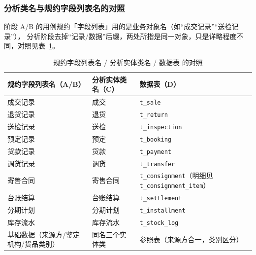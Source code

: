 \documentclass[12pt, a4paper]{ctexart}
\newcommand{\code}[1]{\texttt{\small #1}}
\begin{document}
\subsubsection{分析类名与规约字段列表名的对照}

阶段 A/B 的用例规约「字段列表」用的是业务对象名（如“成交记录”“送检记录”），
分析阶段去掉“记录/数据”后缀，两处所指是同一对象，只是详略程度不同，对照见表~\ref{tab:name-map}。

\begin{table}[H]
\centering
\small
\caption{规约字段列表名 / 分析实体类名 / 数据表 的对照}
\label{tab:name-map}
\begin{tabularx}{\textwidth}{@{}p{4.7cm} p{3.2cm} X@{}}
\toprule
规约字段列表名（A/B） & 分析实体类名（C） & 数据表（D） \\
\midrule
成交记录 & 成交 & \code{t\_sale} \\
退货记录 & 退货 & \code{t\_return} \\
送检记录 & 送检 & \code{t\_inspection} \\
预定记录 & 预定 & \code{t\_booking} \\
货款记录 & 货款 & \code{t\_payment} \\
调货记录 & 调货 & \code{t\_transfer} \\
寄售合同 & 寄售合同 & \code{t\_consignment}（明细见 \code{t\_consignment\_item}） \\
台账结算 & 台账结算 & \code{t\_settlement} \\
分期计划 & 分期计划 & \code{t\_installment} \\
库存流水 & 库存流水 & \code{t\_stock\_log} \\
基础数据（来源方/鉴定机构/货品类别） & 同名三个实体类 & 参照表（来源方合一，类别区分） \\
\bottomrule
\end{tabularx}
\end{table}
\end{document}
